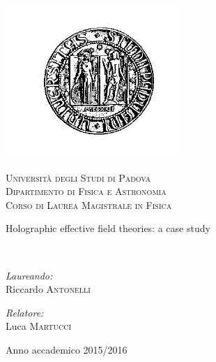 \begin{titlepage}
\begin{center}
 
\includegraphics[scale=.5]{images/logoBlack}
 
\textsc{\LARGE Università degli Studi di Padova}\\[1.5cm]
 
\textsc{\Large Dipartimento di Fisica e Astronomia\\[0.2cm] Corso di Laurea Magistrale in Fisica}\\[2cm]
  

{\Huge \doublespacing \bfseries \begin{spacing}{1}{Holographic effective field theories: a case study}\end{spacing}}
~\\[4cm]
 
\begin{minipage}{0.4\textwidth}
\begin{flushleft} \large
\emph{Laureando:}\\
Riccardo \textsc{Antonelli}
\end{flushleft}
\end{minipage}
\begin{minipage}{0.4\textwidth}
\begin{flushright} \large
\emph{Relatore:} \\
Luca \textsc{Martucci}
\end{flushright}
\end{minipage}
 
\vfill
 
{\large Anno accademico 2015/2016\\
	}
 
\end{center}

\end{titlepage}

